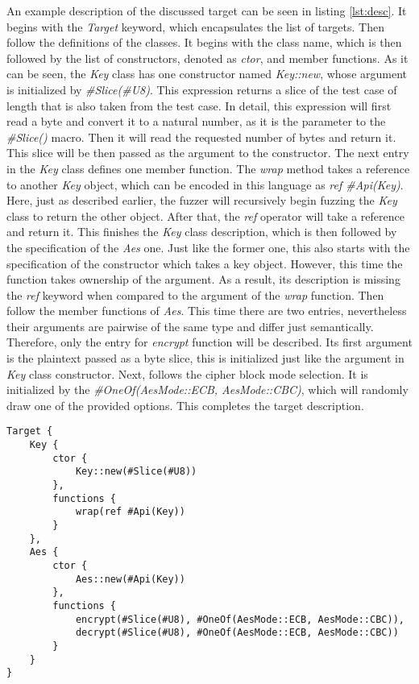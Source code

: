 An example description of the discussed target can be seen in listing \ref{lst:desc}. It begins with the \textit{Target} keyword, which encapsulates the list of targets. Then follow the definitions of the classes. It begins with the class name, which is then followed by the list of constructors, denoted as \textit{ctor}, and member functions. As it can be seen, the \textit{Key} class has one constructor named \textit{Key::new}, whose argument is initialized by \textit{\#Slice(\#U8)}. This expression returns a slice of the test case of length that is also taken from the test case. In detail, this expression will first read a byte and convert it to a natural number, as it is the parameter to the \textit{\#Slice()} macro. Then it will read the requested number of bytes and return it. This slice will be then passed as the argument to the constructor. The next entry in the \textit{Key} class defines one member function. The \textit{wrap} method takes a reference to another \textit{Key} object, which can be encoded in this language as \textit{ref \#Api(Key)}. Here, just as described earlier, the fuzzer will recursively begin fuzzing the \textit{Key} class to return the other object. After that, the \textit{ref} operator will take a reference and return it. This finishes the \textit{Key} class description, which is then followed by the specification of the \textit{Aes} one. Just like the former one, this also starts with the specification of the constructor which takes a key object. However, this time the function takes ownership of the argument. As a result, its description is missing the \textit{ref} keyword when compared to the argument of the \textit{wrap} function. Then follow the member functions of \textit{Aes}. This time there are two entries, nevertheless their arguments are pairwise of the same type and differ just semantically. Therefore, only the entry for \textit{encrypt} function will be described. Its first argument is the plaintext passed as a byte slice, this is initialized just like the argument in \textit{Key} class constructor. Next, follows the cipher block mode selection. It is initialized by the \textit{\#OneOf(AesMode::ECB, AesMode::CBC)}, which will randomly draw one of the provided options. This completes the target description.

\begin{lstlisting}[caption={API description in the created language.}, label={lst:desc}]
Target {
    Key {
        ctor {
            Key::new(#Slice(#U8))
        },
        functions {
            wrap(ref #Api(Key))
        }
    },
    Aes {
        ctor {
            Aes::new(#Api(Key))
        },
        functions {
            encrypt(#Slice(#U8), #OneOf(AesMode::ECB, AesMode::CBC)),
            decrypt(#Slice(#U8), #OneOf(AesMode::ECB, AesMode::CBC))
        }
    }
}    
\end{lstlisting}

